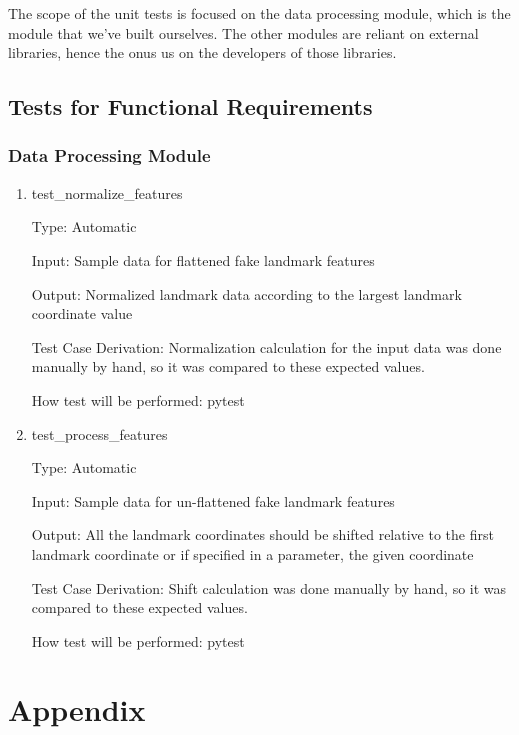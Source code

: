 \documentclass[12pt, titlepage]{article}
\begin{document}
The scope of the unit tests is focused on the data processing module, which is the module that we've built ourselves. The other modules are reliant on external libraries, hence the onus us on the developers of those libraries.

\subsection{Tests for Functional Requirements}

\subsubsection{Data Processing Module}

\begin{enumerate}

\item{test\_normalize\_features}

Type: Automatic
					
					
Input: Sample data for flattened fake landmark features
					
Output: Normalized landmark data according to the largest landmark coordinate value

Test Case Derivation: Normalization calculation for the input data was done manually by hand, so it was compared to these expected values.

How test will be performed: pytest
					
\item{test\_process\_features}

Type: Automatic
					
					
Input: Sample data for un-flattened fake landmark features
					
Output: All the landmark coordinates should be shifted relative to the first landmark coordinate or if specified in a parameter, the given coordinate

Test Case Derivation: Shift calculation was done manually by hand, so it was compared to these expected values.

How test will be performed:  pytest
    
\end{enumerate}

\section{Appendix}
\end{document}
